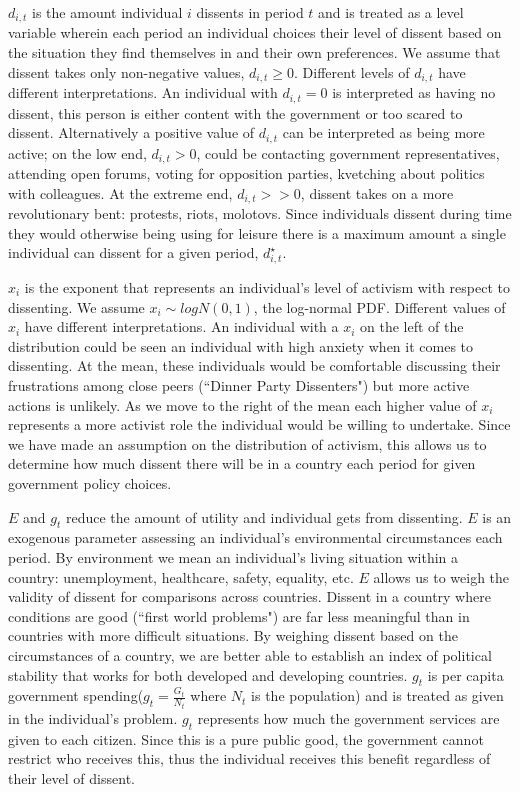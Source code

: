 \documentclass[12pt]{article}
\begin{document}
\begin{spacing}{1.5}
$ d_{i,t} $ is the amount individual $i$ dissents in period $t$ and is treated as a level variable wherein each period an individual choices their level of dissent based on the situation they find themselves in and their own preferences. We assume that dissent takes only non-negative values, $d_{i,t}\geq0$. Different levels of $d_{i,t}$ have different interpretations. An individual with $d_{i,t}=0$ is interpreted as having no dissent, this person is either content with the government or too scared to dissent. Alternatively a positive value of $d_{i,t}$ can be interpreted as being more active; on the low end, $d_{i,t}>0$, could be contacting government representatives, attending open forums, voting for opposition parties, kvetching about politics with colleagues. At the extreme end, $d_{i,t}>>0$, dissent takes on a more revolutionary bent: protests, riots, molotovs. Since individuals dissent during time they would otherwise being using for leisure there is a maximum amount a single individual can dissent for a given period, $d_{i,t}^\star$.  

$x_i$ is the exponent that represents an individual's level of activism with respect to dissenting. We assume $x_i \sim logN(0,1)$, the log-normal PDF. Different values of $x_i$ have different interpretations. An individual with a $x_i$ on the left of the distribution could be seen an individual with high anxiety when it comes to dissenting. At the mean, these individuals would be comfortable discussing their frustrations among close peers (``Dinner Party Dissenters") but more active actions is unlikely. As we move to the right of the mean each higher value of $x_i$ represents a more activist role the individual would be willing to undertake. Since we have made an assumption on the distribution of activism, this allows us to determine how much dissent there will be in a country each period for given government policy choices.    

$E$ and $g_t$ reduce the amount of utility and individual gets from dissenting. $E$ is an exogenous parameter assessing an individual's environmental circumstances each period. By environment we mean an individual's living situation within a country: unemployment, healthcare, safety, equality, etc. $E$ allows us to weigh the validity of dissent for comparisons across countries. Dissent in a country where conditions are good (``first world problems")  are far less meaningful than in countries with more difficult situations. By weighing dissent based on the circumstances of a country, we are better able to establish an index of political stability that works for both developed and developing countries. $g_t$ is per capita government spending($g_t=\frac{G_t}{N_t}$ where $N_t$ is the population) and is treated as given in the individual's problem. $g_t$ represents how much the government services are given to each citizen. Since this is a pure public good, the government cannot restrict who receives this, thus the individual receives this benefit regardless of their level of dissent. 


\end{spacing}
\end{document}
